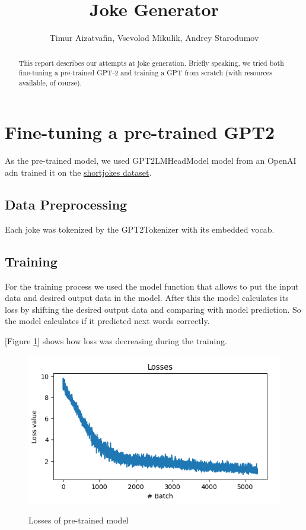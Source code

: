 \documentclass[12pt]{article}
\begin{document}
\title{Joke Generator}
\author{Timur Aizatvafin, Vsevolod Mikulik, Andrey Starodumov}

\maketitle

\begin{abstract}
	This report describes our attempts at joke generation. Briefly speaking, we tried both fine-tuning a pre-trained GPT-2 and
    training a GPT from scratch (with resources available, of course).
\end{abstract}

\section{Fine-tuning a pre-trained GPT2}
As the pre-trained model, we used GPT2LMHeadModel model from an OpenAI adn trained it on the \href{https://www.kaggle.com/datasets/abhinavmoudgil95/short-jokes}{shortjokes dataset}.
    
\subsection{Data Preprocessing}
Each joke was tokenized by the GPT2Tokenizer with its embedded vocab.

\subsection{Training}
For the training process we used the model function that allows to put the input data and desired output data in the model. After this the model calculates its loss by shifting the desired output data and comparing with model prediction. So the model calculates if it predicted next words correctly.

[Figure \ref{pic:gpt2-loss}] shows how loss was decreasing during the training.

\begin{figure}[ht]
\caption{Losses of pre-trained model}
\includegraphics[width=\textwidth]{gpt2-loss.png}
\label{pic:gpt2-loss}
\end{figure}
\end{document}
